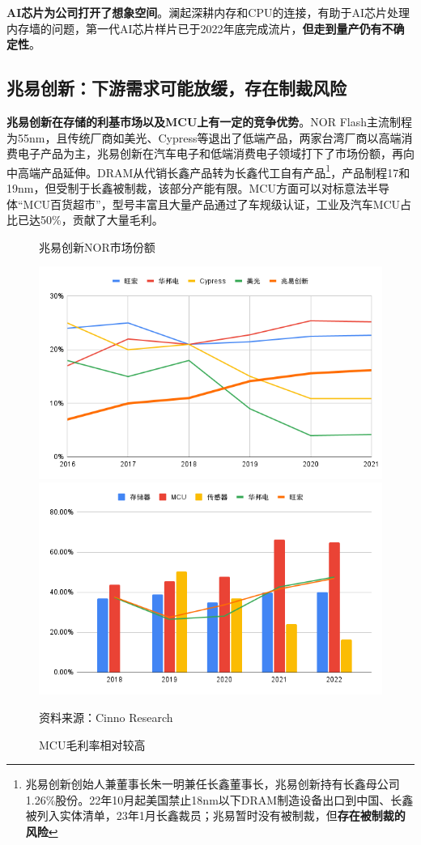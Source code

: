 \documentclass[a4paper,12pt]{ctexart}
\begin{document}
\textbf{AI芯片为公司打开了想象空间}。澜起深耕内存和CPU的连接，有助于AI芯片处理内存墙的问题，第一代AI芯片样片已于2022年底完成流片，\textbf{但走到量产仍有不确定性}。
\subsection{兆易创新：下游需求可能放缓，存在制裁风险}
\textbf{兆易创新在存储的利基市场以及MCU上有一定的竞争优势}。NOR Flash主流制程为55nm，且传统厂商如美光、Cypress等退出了低端产品，两家台湾厂商以高端消费电子产品为主，兆易创新在汽车电子和低端消费电子领域打下了市场份额，再向中高端产品延伸。DRAM从代销长鑫产品转为长鑫代工自有产品\footnote{兆易创新创始人兼董事长朱一明兼任长鑫董事长，兆易创新持有长鑫母公司1.26\%股份。22年10月起美国禁止18nm以下DRAM制造设备出口到中国、长鑫被列入实体清单，23年1月长鑫裁员；兆易暂时没有被制裁，但\textbf{存在被制裁的风险}}，产品制程17和19nm，但受制于长鑫被制裁，该部分产能有限。MCU方面可以对标意法半导体“MCU百货超市”，型号丰富且大量产品通过了车规级认证，工业及汽车MCU占比已达50\%，贡献了大量毛利。
\begin{figure}[H]
    \begin{minipage}{0.48\linewidth}
        \caption{兆易创新NOR市场份额}
        \centering
        \includegraphics[width=\linewidth]{img/nor.png}
    \end{minipage}
    \begin{minipage}{0.48\linewidth}
        \caption{MCU毛利率相对较高}
        \centering
        \includegraphics[width=\linewidth]{img/margin.png}
    \end{minipage}
    \par\footnotesize{资料来源：Cinno Research}
\end{figure}
\end{document}
